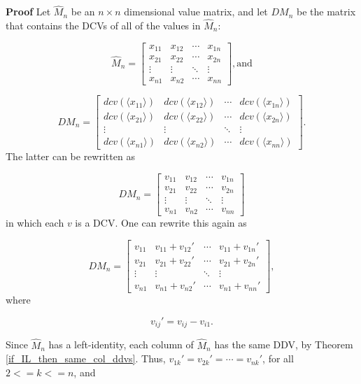 \documentclass[10pt,letterpaper]{article}
\newenvironment{proof}{\noindent\textbf{Proof} }{\qed \newline}
\newcommand{\qed}{\nobreak \ifvmode \relax \else
      \ifdim\lastskip<1.5em \hskip-\lastskip
      \hskip1.5em plus0em minus0.5em \fi \nobreak
      \vrule height0.75em width0.5em depth0.25em\fi}
\numberwithin{equation}{section}
\begin{document}
\begin{proof}Let $\hat M_n$ be an $n \times n$ dimensional value
  matrix, and let $DM_n$ be the matrix that contains the DCVs of all
  of the values in $\hat M_n$:

\[ \hat M_n = \left[ \begin{matrix} 
  x_{11} & x_{12} & \cdots & x_{1n} \\
  x_{21} & x_{22} & \cdots & x_{2n} \\
  \vdots & \vdots & \ddots & \vdots \\
  x_{n1} & x_{n2} & \cdots & x_{nn}
 \end{matrix} \right] , \mbox{and} \]

\[ DM_n = \left[ \begin{matrix}
    dcv(\langle x_{11} \rangle) & dcv(\langle x_{12} \rangle) & \cdots & dcv(\langle x_{1n} \rangle) \\
    dcv(\langle x_{21} \rangle) & dcv(\langle x_{22} \rangle) & \cdots & dcv(\langle x_{2n} \rangle) \\
    \vdots & \vdots & \ddots & \vdots \\
    dcv(\langle x_{n1} \rangle) & dcv(\langle x_{n2} \rangle) & \cdots
    & dcv(\langle x_{nn} \rangle)
 \end{matrix} \right] . \] The latter can be rewritten as

\[ DM_n = \left[ \begin{matrix} 
  v_{11} & v_{12} & \cdots & v_{1n} \\
  v_{21} & v_{22} & \cdots & v_{2n} \\
  \vdots & \vdots & \ddots & \vdots \\
  v_{n1} & v_{n2} & \cdots & v_{nn}
\end{matrix} \right] \] in which each $v$ is a DCV.  One can rewrite
this again as

\[ DM_n = \left[ \begin{matrix} 
  v_{11} & v_{11} + v_{12} \prime & \cdots & v_{11} + v_{1n} \prime \\
  v_{21} & v_{21} + v_{22} \prime & \cdots & v_{21} + v_{2n} \prime \\
  \vdots & \vdots & \ddots & \vdots \\
  v_{n1} & v_{n1} + v_{n2} \prime & \cdots & v_{n1} + v_{nn} \prime
 \end{matrix} \right] , \] where

\[ v_{ij} \prime = v_{ij} - v_{i1} . \]

Since $\hat M_n$ has a left-identity, each column of $\hat M_n$ has
the same DDV, by Theorem \ref{if_IL_then_same_col_ddvs}.  Thus,
$v_{1k} \prime = v_{2k} \prime = \cdots = v_{nk} \prime$, for all $2
<= k <= n$, and


\end{proof}
\end{document}
